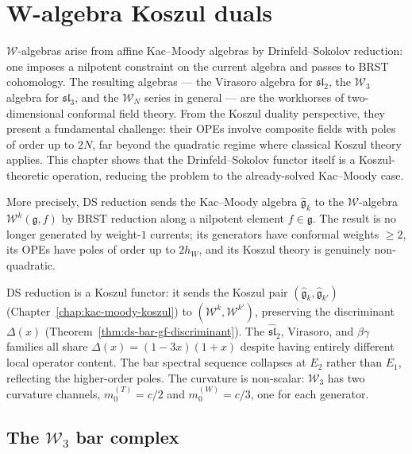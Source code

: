 \chapter{W-algebra Koszul duals}\label{chap:w-algebra-koszul}
\label{chap:w-algebras}

$\mathcal{W}$-algebras arise from affine Kac--Moody algebras by
Drinfeld--Sokolov reduction: one imposes a nilpotent constraint on the
current algebra and passes to BRST cohomology.  The resulting
algebras --- the Virasoro algebra for $\mathfrak{sl}_2$, the
$\mathcal{W}_3$ algebra for $\mathfrak{sl}_3$, and the $\mathcal{W}_N$
series in general --- are the workhorses of two-dimensional conformal
field theory.  From the Koszul duality perspective, they present a
fundamental challenge: their OPEs involve composite fields with poles
of order up to $2N$, far beyond the quadratic regime where classical
Koszul theory applies.  This chapter shows that the Drinfeld--Sokolov
functor itself is a Koszul-theoretic operation, reducing the problem
to the already-solved Kac--Moody case.


More precisely, DS reduction \cite{DS, FF} sends the Kac--Moody algebra
$\widehat{\mathfrak{g}}_k$ to the $\mathcal{W}$-algebra
$\mathcal{W}^k(\mathfrak{g}, f)$ by BRST reduction along a nilpotent
element $f \in \mathfrak{g}$.  The result is no longer generated by
weight-$1$ currents; its generators have conformal weights $\geq 2$, its
OPEs have poles of order up to $2h_W$, and its Koszul theory is
genuinely non-quadratic.

DS reduction is a Koszul functor: it sends the Koszul pair
$(\widehat{\mathfrak{g}}_k, \widehat{\mathfrak{g}}_{k'})$
(Chapter~\ref{chap:kac-moody-koszul}) to
$(\mathcal{W}^k, \mathcal{W}^{k'})$, preserving the
discriminant $\Delta(x)$
(Theorem~\ref{thm:ds-bar-gf-discriminant}).  The
$\widehat{\mathfrak{sl}}_2$, Virasoro, and $\beta\gamma$ families
all share $\Delta(x) = (1-3x)(1+x)$ despite having entirely
different local operator content.  The bar spectral sequence collapses
at $E_2$ rather than $E_1$, reflecting the higher-order poles.  The
curvature is non-scalar: $\mathcal{W}_3$ has two curvature channels,
$m_0^{(T)} = c/2$ and $m_0^{(W)} = c/3$, one for each generator.

\section{The $\mathcal{W}_3$ bar complex}

